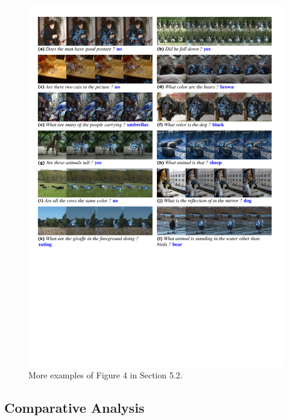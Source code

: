 \begin{figure}[ht!]
\centering
\includegraphics[width=\linewidth]{more_reduced}
\caption{More examples of Figure 4 in Section 5.2.}
\label{fig:more}
\end{figure} 

\newpage
\subsection{Comparative Analysis}


